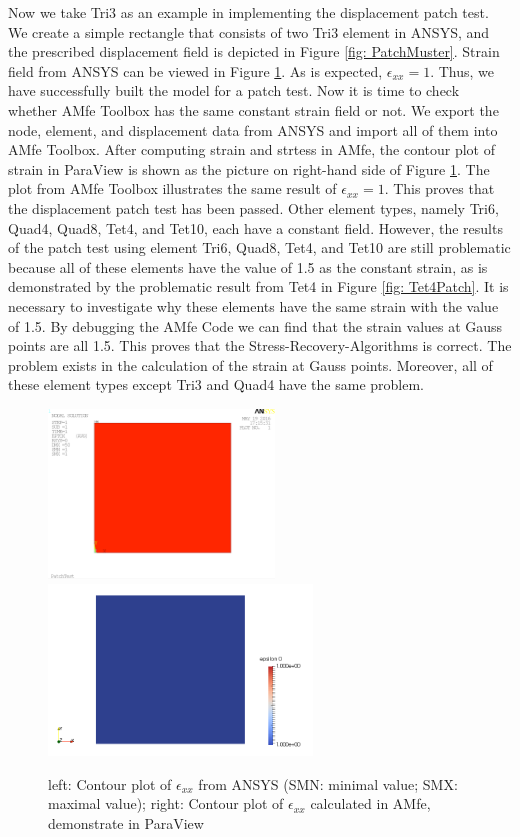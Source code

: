 Now we take Tri3 as an example in implementing the displacement patch test. We create a simple rectangle that consists of two Tri3 element in ANSYS, and the prescribed displacement field is depicted in Figure \ref{fig: PatchMuster}. Strain field from ANSYS can be viewed in Figure \ref{fig: PatchTest}. As is expected, $\epsilon_{xx} = 1$. Thus, we have successfully built the model for a patch test. Now it is time to check whether AMfe Toolbox has the same constant strain field or not. We export the node, element, and displacement data from ANSYS and import all of them into AMfe Toolbox. After computing strain and strtess in AMfe, the contour plot of strain in ParaView is shown as the picture on right-hand side of Figure \ref{fig: PatchTest}. The plot from AMfe Toolbox illustrates the same result of $\epsilon_ {xx} = 1$. This proves that the displacement patch test has been passed. Other element types,  namely Tri6, Quad4, Quad8, Tet4, and Tet10, each have a constant field. However, the results of the patch test using element Tri6, Quad8, Tet4, and Tet10 are still problematic because all of these elements have the value of 1.5 as the constant strain, as is demonstrated by the problematic result from Tet4 in Figure \ref{fig: Tet4Patch}. It is necessary to investigate why these elements have the same strain with the value of 1.5.  By debugging the AMfe Code we can find that the strain values at Gauss points are all 1.5. This proves that the Stress-Recovery-Algorithms is correct. The problem exists in the calculation of the strain at Gauss points. Moreover, all of these element types except Tri3 and Quad4 have the same problem.   



\begin{figure}
	\begin{center}
		\includegraphics[width=6cm,clip]{PatchTest.png} 		
		\includegraphics[width=7cm,clip]{PatchParaView.pdf} 		
		\caption{left: Contour plot of $\epsilon_{xx}$ from ANSYS (SMN: minimal value; SMX: maximal value); right: Contour plot of $\epsilon_{xx}$ calculated in AMfe, demonstrate in ParaView} \label{fig: PatchTest}
	\end{center}
\end{figure}

